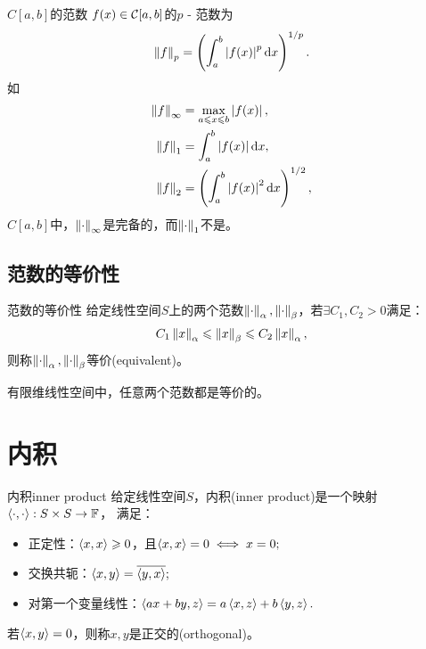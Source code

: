 \begin{example}
    {$C[a,b]$的范数}{}
    $f(x)\in\mathcal C[a,b]$的$p$ - 范数为
    \[
        \left\lVert f\right\rVert_p=\left(\int_a^b\left\lvert f(x)\right\rvert^p\mathop{}\!\mathrm{d} x\right)^{1/p}.
    \]
    如
    \begin{subequations}
        \begin{align}
            \left\lVert f\right\rVert_\infty&=\max_{a\leqslant x\leqslant b}\left\lvert f(x)\right\rvert,\\
            \left\lVert f\right\rVert_1&=\int_a^b\left\lvert f(x)\right\rvert\mathop{}\!\mathrm{d} x,\\
            \left\lVert f\right\rVert_2&=\left(\int_a^b\left\lvert f(x)\right\rvert^2\mathop{}\!\mathrm{d} x\right)^{1/2},
        \end{align}
    \end{subequations}
    $C[a,b]$中，$\left\lVert\cdot\right\rVert_\infty$是完备的，而$\left\lVert\cdot\right\rVert_1$不是。
\end{example}

\subsection{范数的等价性}

\begin{definition}
    {范数的等价性}{}
    给定线性空间$S$上的两个范数$\left\lVert\cdot\right\rVert_\alpha,\left\lVert\cdot\right\rVert_\beta$，若$\exists C_1,C_2>0$满足：
    \[
        C_1\left\lVert x\right\rVert_\alpha\leqslant\left\lVert x\right\rVert_\beta\leqslant C_2\left\lVert x\right\rVert_\alpha,
    \]
    则称$\left\lVert\cdot\right\rVert_\alpha,\left\lVert\cdot\right\rVert_\beta$等价(equivalent)。
\end{definition}

\begin{theorem}
    {}{}
    有限维线性空间中，任意两个范数都是等价的。
\end{theorem}


\section{内积}
\label{sec:inner product}

\begin{definition}
    {内积}{inner product}
    给定线性空间$S$，内积(inner product)是一个映射$\left\langle \cdot,\cdot\right\rangle:S\times S\to\mathbb F$，
    满足：
    \begin{itemize}
        \item 正定性：$\left\langle x,x\right\rangle\geqslant 0$，且$\left\langle x,x\right\rangle=0\iff x=0;$
        \item 交换共轭：$\left\langle x,y\right\rangle=\overline{\left\langle y,x\right\rangle};$
        \item 对第一个变量线性：$\left\langle ax+by,z\right\rangle=a\left\langle x,z\right\rangle+b\left\langle y,z\right\rangle.$
    \end{itemize}
    若$\left\langle x,y\right\rangle=0$，则称$x,y$是正交的(orthogonal)。
\end{definition}

